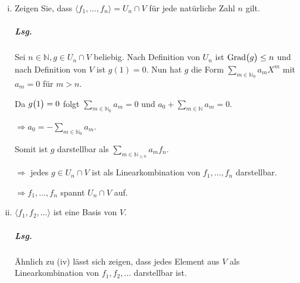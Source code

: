 \documentclass{scrreprt}
\newcommand\Grad{\text{Grad}}
\begin{document}
\begin{enumerate}[(i)]
\item Zeigen Sie, dass
  ${\big\langle} f_1, \ldots, f_n {\big\rangle} = U_n \cap V$
  für jede natürliche Zahl $n$ gilt.

  \subparagraph{Lsg.} Sei $n \in \mathbb{N}, g \in U_n \cap V$ beliebig.
  Nach Definition von $U_n$ ist $\Grad\qty\big(g) \leq n$ und nach Definition
  von $V$ ist $g(1) = 0$.
  Nun hat $g$ die Form $\sum_{m \in \mathbb{N}_0}a_mX^m$ mit $a_m = 0$ für
  $m > n$.

  Da $g\qty\big(1) = 0$ folgt $\sum_{m \in \mathbb{N}_0}a_m = 0$ und
  $a_0 + \sum_{m \in \mathbb{N}}a_m = 0$.

  $\Rightarrow a_0 = -\sum_{m \in \mathbb{N}_0}a_m$.

  Somit ist $g$ darstellbar als $\sum_{m \in \mathbb{N}_{\leq n}} a_mf_n$.

  $\Rightarrow$ jedes $g \in U_n \cap V$ ist als Linearkombination von
  $f_1, \ldots, f_n$ darstellbar.

  $\Rightarrow f_1, \ldots, f_n$ spannt $U_n \cap V$ auf.

\item ${\big\langle} f_1, f_2, \ldots{\big\rangle}$ ist eine Basis von $V$.

  \subparagraph{Lsg.}
  Ähnlich zu (iv) lässt sich zeigen, dass jedes Element aus $V$ als
  Linearkombination von $f_1, f_2, \ldots$ darstellbar ist.
\end{enumerate}
\end{document}
